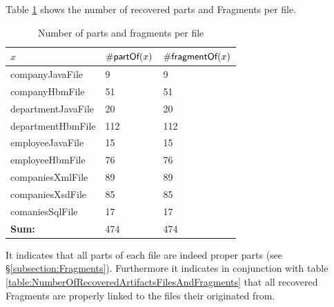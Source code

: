 Table \ref{table:NumberOfPartsAndFragmentsPerFile} shows the number of recovered parts and \glspl{Fragment} per file. 
\begin{table}[h!]
\begin{center}
\begin{tabular}{|l|l|l|}
\hline
$x$ & $\#\textsf{partOf}(x)$ & $\#\textsf{fragmentOf}(x)$
\\ \hline
companyJavaFile & 9 & 9 
\\ \hline
companyHbmFile & 51 & 51 
\\ \hline
departmentJavaFile & 20 & 20 
\\ \hline
departmentHbmFile & 112 & 112 
\\ \hline
employeeJavaFile & 15 & 15 
\\ \hline
employeeHbmFile & 76 & 76 
\\ \hline
companiesXmlFile & 89 & 89 
\\ \hline
companiesXsdFile & 85 & 85 
\\ \hline
comaniesSqlFile & 17 & 17 
\\ \hline \hline
\textbf{Sum:} & 474 & 474 
\\ \hline 
\end{tabular}
\end{center}
\caption{Number of parts and fragments per file}
\label{table:NumberOfPartsAndFragmentsPerFile}
\end{table}
It indicates that all parts of each file are indeed proper parts (see §\ref{subsection:Fragments}).
Furthermore it indicates in conjunction with table \ref{table:NumberOfRecoveredArtifactsFilesAndFragments} that all recovered \glspl{Fragment} are properly linked to the files their originated from.



%
